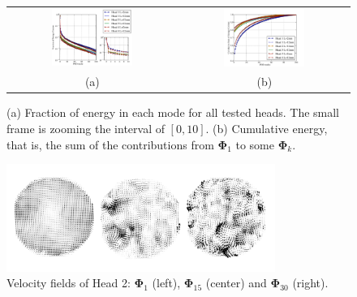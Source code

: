 \documentclass[10pt,fleqn,a4paper]{article}
\newcommand{\bv}[1]{\mathbf{#1}}
\begin{document}
\begin{figure}[h]
\begin{tabular}{cc}
 \includegraphics[width=0.5\textwidth]{./imgs/energy_spectra.pdf} & \includegraphics[width=0.5\textwidth]{./imgs/cumulative_energy.pdf} \\
(a) & (b)
\end{tabular}
 \caption{(a) Fraction of energy in each mode for all tested heads. The small frame is zooming the interval of $[0,10]$. (b) Cumulative energy, that is, the sum of the contributions from $\bv{\Phi}_1$ to some $\bv{\Phi}_k$.}
 \label{fig: energy_fraction}
\end{figure}


\begin{figure}[h]
 \centering
 \includegraphics[width=0.78\textwidth]{./imgs/scania-modes.png}
 \caption{Velocity fields of Head 2: $\bv{\Phi}_1$ (left), $\bv{\Phi}_{15}$ (center) and $\bv{\Phi}_{30}$ (right).}
 \label{fig: organization}
\end{figure}

\clearpage
\end{document}
